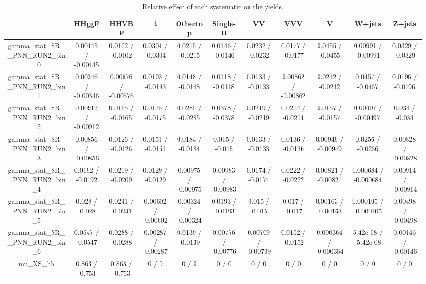 \documentclass[10pt]{article}
\begin{document}
\begin{table}[htbp]
\begin{center}
\begin{tabular}{|c|c|c|c|c|c|c|c|c|c|c|}
\hline 
      & HHggF      & HHVBF      & t      & Othertop      & Single-H      & VV      & VVV      & V      & W+jets      & Z+jets \\ 
\hline 
  gamma_stat_SR__PNN_RUN2_bin_0 & 0.00445 / -0.00445 & 0.0102 / -0.0102 & 0.0304 / -0.0304 & 0.0215 / -0.0215 & 0.0146 / -0.0146 & 0.0232 / -0.0232 & 0.0177 / -0.0177 & 0.0455 / -0.0455 & 0.00991 / -0.00991 & 0.0329 / -0.0329 \\ 
  gamma_stat_SR__PNN_RUN2_bin_1 & 0.00346 / -0.00346 & 0.00676 / -0.00676 & 0.0193 / -0.0193 & 0.0148 / -0.0148 & 0.0118 / -0.0118 & 0.0133 / -0.0133 & 0.00862 / -0.00862 & 0.0212 / -0.0212 & 0.0457 / -0.0457 & 0.0196 / -0.0196 \\ 
  gamma_stat_SR__PNN_RUN2_bin_2 & 0.00912 / -0.00912 & 0.0165 / -0.0165 & 0.0175 / -0.0175 & 0.0285 / -0.0285 & 0.0378 / -0.0378 & 0.0219 / -0.0219 & 0.0214 / -0.0214 & 0.0157 / -0.0157 & 0.00497 / -0.00497 & 0.034 / -0.034 \\ 
  gamma_stat_SR__PNN_RUN2_bin_3 & 0.00856 / -0.00856 & 0.0126 / -0.0126 & 0.0151 / -0.0151 & 0.0184 / -0.0184 & 0.015 / -0.015 & 0.0133 / -0.0133 & 0.0136 / -0.0136 & 0.00949 / -0.00949 & 0.0256 / -0.0256 & 0.00828 / -0.00828 \\ 
  gamma_stat_SR__PNN_RUN2_bin_4 & 0.0192 / -0.0192 & 0.0209 / -0.0209 & 0.0129 / -0.0129 & 0.00975 / -0.00975 & 0.00983 / -0.00983 & 0.0174 / -0.0174 & 0.0222 / -0.0222 & 0.00821 / -0.00821 & 0.000684 / -0.000684 & 0.00914 / -0.00914 \\ 
  gamma_stat_SR__PNN_RUN2_bin_5 & 0.028 / -0.028 & 0.0241 / -0.0241 & 0.00602 / -0.00602 & 0.00324 / -0.00324 & 0.0193 / -0.0193 & 0.015 / -0.015 & 0.017 / -0.017 & 0.00163 / -0.00163 & 0.000105 / -0.000105 & 0.00498 / -0.00498 \\ 
  gamma_stat_SR__PNN_RUN2_bin_6 & 0.0547 / -0.0547 & 0.0288 / -0.0288 & 0.00287 / -0.00287 & 0.0139 / -0.0139 & 0.00776 / -0.00776 & 0.00709 / -0.00709 & 0.0152 / -0.0152 & 0.000364 / -0.000364 & 5.42e-08 / -5.42e-08 & 0.00146 / -0.00146 \\ 
  mu_XS_hh & 0.863 / -0.753 & 0.863 / -0.753 & 0 / 0 & 0 / 0 & 0 / 0 & 0 / 0 & 0 / 0 & 0 / 0 & 0 / 0 & 0 / 0 \\ 
\hline 
\end{tabular} 
\caption{Relative effect of each systematic on the yields.} 
\end{center} 
\end{table} 
\end{document}
